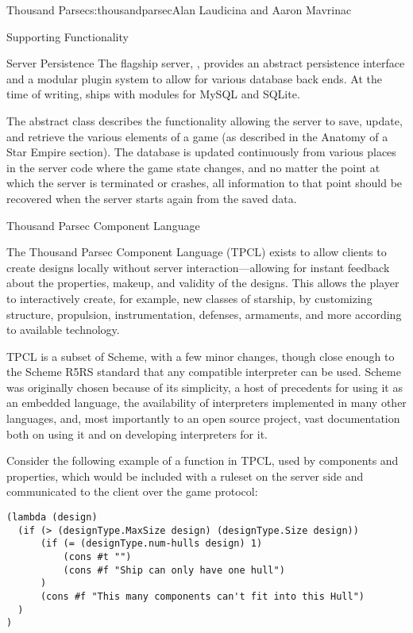 \begin{aosachapter}{Thousand Parsec}{s:thousandparsec}{Alan Laudicina and Aaron Mavrinac}
\begin{aosasect1}{Supporting Functionality}
\begin{aosasect2}{Server Persistence}
The flagship server, , provides an abstract
persistence interface and a modular plugin system to allow for various
database back ends. At the time of writing,  ships
with modules for MySQL and SQLite.

The abstract  class describes the functionality
allowing the server to save, update, and retrieve the various elements
of a game (as described in the Anatomy of a Star Empire section). The
database is updated continuously from various places in the server
code where the game state changes, and no matter the point at which
the server is terminated or crashes, all information to that point
should be recovered when the server starts again from the saved data.

\end{aosasect2}

\begin{aosasect2}{Thousand Parsec Component Language}

The Thousand Parsec Component Language (TPCL) exists to allow clients
to create designs locally without server interaction---allowing for
instant feedback about the properties, makeup, and validity of the
designs. This allows the player to interactively create, for example,
new classes of starship, by customizing structure, propulsion,
instrumentation, defenses, armaments, and more according to available
technology.

TPCL is a subset of Scheme, with a few minor changes, though close
enough to the Scheme R5RS standard that any compatible interpreter can
be used. Scheme was originally chosen because of its simplicity, a
host of precedents for using it as an embedded language, the
availability of interpreters implemented in many other languages, and,
most importantly to an open source project, vast documentation both on
using it and on developing interpreters for it.

Consider the following example of a  function in
TPCL, used by components and properties, which would be included with
a ruleset on the server side and communicated to the client over the
game protocol:

\begin{verbatim}
(lambda (design)
  (if (> (designType.MaxSize design) (designType.Size design))
      (if (= (designType.num-hulls design) 1)
          (cons #t "")
          (cons #f "Ship can only have one hull")
      )
      (cons #f "This many components can't fit into this Hull")
  )
)
\end{verbatim}


\end{aosasect2}
\end{aosasect1}
\end{aosachapter}
